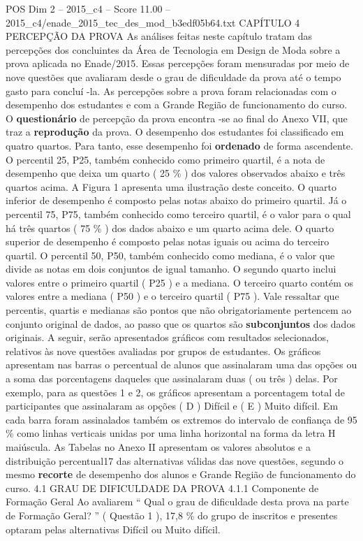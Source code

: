 \begin{textsample}{POS Dim 2 – 2015\_c4 – Score 11.00 – 2015\_c4/enade\_2015\_tec\_des\_mod\_b3edf05b64.txt}  \label{ex:f2_pos_089}
CAPÍTULO 4 PERCEPÇÃO DA PROVA As análises feitas neste capítulo tratam das percepções dos concluintes da Área de Tecnologia em Design de Moda sobre a prova aplicada no Enade/2015.
Essas percepções foram mensuradas por meio de nove questões que avaliaram desde o grau de dificuldade da prova até o tempo gasto para concluí -la.
As percepções sobre a prova foram relacionadas com o desempenho dos estudantes e com a Grande Região de funcionamento do curso.
O \textbf{questionário} de percepção da prova encontra -se ao final do Anexo VII, que traz a \textbf{reprodução} da prova.
O desempenho dos estudantes foi classificado em quatro quartos.
Para tanto, esse desempenho foi \textbf{ordenado} de forma ascendente.
O percentil 25, P25, também conhecido como primeiro quartil, é a nota de desempenho que deixa um quarto ( 25 \% ) dos valores observados abaixo e três quartos acima.
A Figura 1 apresenta uma ilustração deste conceito.
O quarto inferior de desempenho é composto pelas notas abaixo do primeiro quartil.
Já o percentil 75, P75, também conhecido como terceiro quartil, é o valor para o qual há três quartos ( 75 \% ) dos dados abaixo e um quarto acima dele.
O quarto superior de desempenho é composto pelas notas iguais ou acima do terceiro quartil.
O percentil 50, P50, também conhecido como mediana, é o valor que divide as notas em dois conjuntos de igual tamanho.
O segundo quarto inclui valores entre o primeiro quartil ( P25 ) e a mediana.
O terceiro quarto contém os valores entre a mediana ( P50 ) e o terceiro quartil ( P75 ).
Vale ressaltar que percentis, quartis e medianas são pontos que não obrigatoriamente pertencem ao conjunto original de dados, ao passo que os quartos são \textbf{subconjuntos} dos dados originais.
A seguir, serão apresentados gráficos com resultados selecionados, relativos às nove questões avaliadas por grupos de estudantes.
Os gráficos apresentam nas barras o percentual de alunos que assinalaram uma das opções ou a soma das porcentagens daqueles que assinalaram duas ( ou três ) delas.
Por exemplo, para as questões 1 e 2, os gráficos apresentam a porcentagem total de participantes que assinalaram as opções ( D ) Difícil e ( E ) Muito difícil.
Em cada barra foram assinalados também os extremos do intervalo de confiança de 95 \% como linhas verticais unidas por uma linha horizontal na forma da letra H maiúscula.
As Tabelas no Anexo II apresentam os valores absolutos e a distribuição percentual17 das alternativas válidas das nove questões, segundo o mesmo \textbf{recorte} de desempenho dos alunos e Grande Região de funcionamento do curso. 4.1 GRAU DE DIFICULDADE DA PROVA 4.1.1 Componente de Formação Geral Ao avaliarem “ Qual o grau de dificuldade desta prova na parte de Formação Geral? ” ( Questão 1 ), 17,8 \% do grupo de inscritos e presentes optaram pelas alternativas Difícil ou Muito difícil.

\end{textsample}
